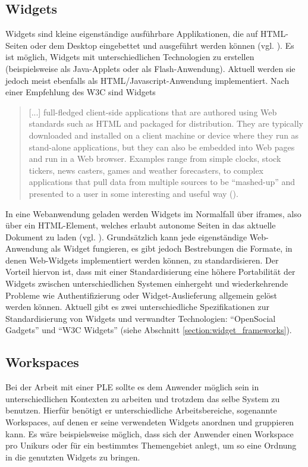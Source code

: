 \subsection{Widgets}\label{section:widgets}
Widgets sind kleine eigenständige ausführbare Applikationen, die auf \ac{HTML}-Seiten oder dem Desktop eingebettet und ausgeführt werden können (vgl. \cite{Taraghi2010}). Es ist möglich, Widgets mit unterschiedlichen Technologien zu erstellen (beispielsweise als Java-Applets oder als Flash-Anwendung). Aktuell werden sie jedoch meist ebenfalls als \ac{HTML}/Javascript-Anwendung implementiert. Nach einer Empfehlung des \ac{W3C} sind Widgets
\begin{quotation}[...] full-fledged client-side applications that are authored using Web standards such as HTML and packaged for distribution. They are typically downloaded and installed on a client machine or device where they run as stand-alone applications, but they can also be embedded into Web pages and run in a Web browser. Examples range from simple clocks, stock tickers, news casters, games and weather forecasters, to complex applications that pull data from multiple sources to be "`mashed-up"' and presented to a user in some interesting and useful way (\cite{W3C-11-2012}).\end{quotation}
In eine Webanwendung geladen werden Widgets im Normalfall über iframes, also über ein \ac{HTML}-Element, welches erlaubt autonome Seiten in das aktuelle Dokument zu laden (vgl. \cite{W3C1999}). Grundsätzlich kann jede eigenständige Web-Anwendung als Widget fungieren, es gibt jedoch Bestrebungen die Formate, in denen Web-Widgets implementiert werden können, zu standardisieren. Der Vorteil hiervon ist, dass mit einer Standardisierung eine höhere Portabilität der Widgets zwischen unterschiedlichen Systemen einhergeht und wiederkehrende Probleme wie Authentifizierung oder Widget-Auslieferung allgemein gelöst werden können. Aktuell gibt es zwei unterschiedliche Spezifikationen zur Standardisierung von Widgets und verwandter Technologien: "`OpenSocial Gadgets"' und "`W3C Widgets"' (siehe Abschnitt \ref{section:widget_frameworks}).

\subsection{Workspaces}
Bei der Arbeit mit einer \ac{PLE} sollte es dem Anwender möglich sein in unterschiedlichen Kontexten zu arbeiten und trotzdem das selbe System zu benutzen. Hierfür benötigt er unterschiedliche Arbeitsbereiche, sogenannte Workspaces, auf denen er seine verwendeten Widgets anordnen und gruppieren kann. Es wäre beispielsweise möglich, dass sich der Anwender einen Workspace pro Unikurs oder für ein bestimmtes Themengebiet anlegt, um so eine Ordnung in die genutzten Widgets zu bringen. 